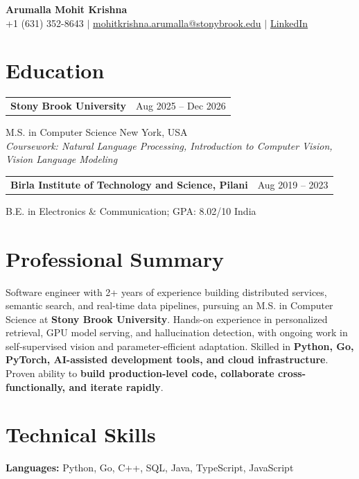 \documentclass[letterpaper,10pt]{article}
\makeatletter
\newcommand{\entry}[2]{%
  \noindent
  \begin{tabularx}{\linewidth}
    {@{}>{\raggedright\arraybackslash}X@{\hspace{6pt}}r@{}}
    \textbf{#1} & #2
  \end{tabularx}\par
}
\makeatother
\begin{document}
\begin{center}
    {\LARGE\bfseries Arumalla Mohit Krishna}\\[3pt]
    +1 (631) 352-8643 $|$
    \href{mailto:mohitkrishna.arumalla@stonybrook.edu}
    {mohitkrishna.arumalla@stonybrook.edu} $|$
    \href{https://linkedin.com/in/mohit-krishna-arumalla}
    {LinkedIn}
\end{center}
\vspace{-8pt}

\section{Education}

\entry
  {\textbf{Stony Brook University}}
  {Aug 2025 -- Dec 2026}

M.S. in Computer Science \hfill New York, USA\\
\textit{
Coursework: Natural Language Processing,
Introduction to Computer Vision, Vision Language Modeling
}
\vspace{3pt}

\entry
  {\textbf{Birla Institute of Technology and Science, Pilani}}
  {Aug 2019 -- 2023}

B.E. in Electronics \& Communication; GPA: 8.02/10 \hfill India
\section{Professional Summary}

Software engineer with 2+ years of experience building distributed services,
semantic search, and real-time data pipelines, pursuing an M.S. in Computer
Science at \textbf{Stony Brook University}. Hands-on experience in personalized
retrieval, GPU model serving, and hallucination detection, with ongoing work
in self-supervised vision and parameter-efficient adaptation. Skilled in
\textbf{Python, Go, PyTorch, AI-assisted development tools, and cloud infrastructure}.
Proven ability to \textbf{build production-level code, collaborate cross-functionally, and iterate rapidly}.

\section{Technical Skills}

\textbf{Languages:}
Python, Go, C++, SQL, Java, TypeScript, JavaScript\\
\end{document}
